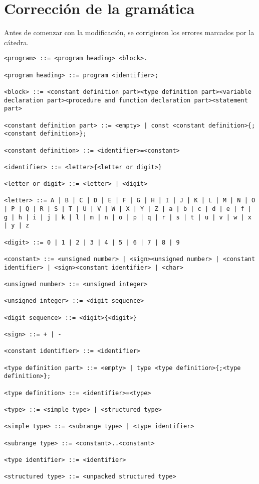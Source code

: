 \documentclass[a4paper,oneside]{report}
\begin{document}
\section{Corrección de la gramática}
Antes de comenzar con la modificación, se corrigieron los errores marcados por la cátedra.
\begin{verbatim}
<program> ::= <program heading> <block>.

<program heading> ::= program <identifier>;

<block> ::= <constant definition part><type definition part><variable declaration part><procedure and function declaration part><statement part>

<constant definition part> ::= <empty> | const <constant definition>{;<constant definition>};

<constant definition> ::= <identifier>=<constant>

<identifier> ::= <letter>{<letter or digit>}

<letter or digit> ::= <letter> | <digit>

<letter> ::= A | B | C | D | E | F | G | H | I | J | K | L | M | N | O | P | Q | R | S | T | U | V | W | X | Y | Z | a | b | c | d | e | f | g | h | i | j | k | l | m | n | o | p | q | r | s | t | u | v | w | x | y | z

<digit> ::= 0 | 1 | 2 | 3 | 4 | 5 | 6 | 7 | 8 | 9

<constant> ::= <unsigned number> | <sign><unsigned number> | <constant identifier> | <sign><constant identifier> | <char>

<unsigned number> ::= <unsigned integer>

<unsigned integer> ::= <digit sequence>

<digit sequence> ::= <digit>{<digit>}

<sign> ::= + | -

<constant identifier> ::= <identifier>

<type definition part> ::= <empty> | type <type definition>{;<type definition>};

<type definition> ::= <identifier>=<type>

<type> ::= <simple type> | <structured type>

<simple type> ::= <subrange type> | <type identifier>

<subrange type> ::= <constant>..<constant>

<type identifier> ::= <identifier>

<structured type> ::= <unpacked structured type>


\end{verbatim}
\end{document}

